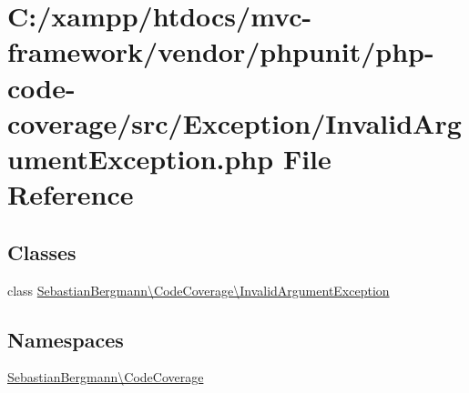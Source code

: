 \hypertarget{phpunit_2php-code-coverage_2src_2_exception_2_invalid_argument_exception_8php}{}\section{C\+:/xampp/htdocs/mvc-\/framework/vendor/phpunit/php-\/code-\/coverage/src/\+Exception/\+Invalid\+Argument\+Exception.php File Reference}
\label{phpunit_2php-code-coverage_2src_2_exception_2_invalid_argument_exception_8php}
\subsection*{Classes}
\begin{DoxyCompactItemize}
\item 
class \hyperlink{class_sebastian_bergmann_1_1_code_coverage_1_1_invalid_argument_exception}{Sebastian\+Bergmann\textbackslash{}\+Code\+Coverage\textbackslash{}\+Invalid\+Argument\+Exception}
\end{DoxyCompactItemize}
\subsection*{Namespaces}
\begin{DoxyCompactItemize}
\item 
 \hyperlink{namespace_sebastian_bergmann_1_1_code_coverage}{Sebastian\+Bergmann\textbackslash{}\+Code\+Coverage}
\end{DoxyCompactItemize}
